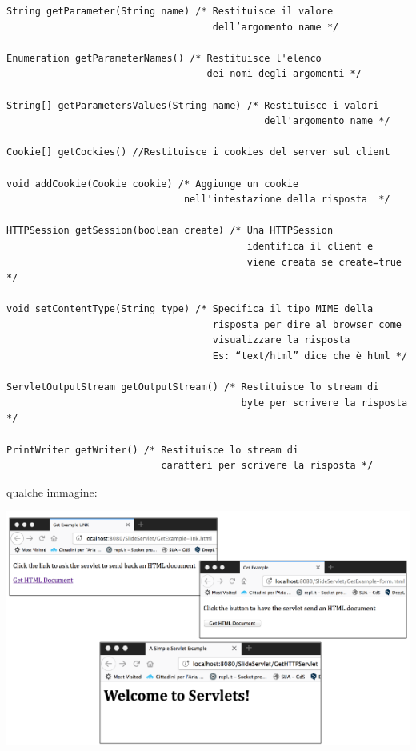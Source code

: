 \documentclass[a4paper,12pt, oneside]{book}
\begin{document}
\begin{verbatim}
String getParameter(String name) /* Restituisce il valore
                                    dell’argomento name */

Enumeration getParameterNames() /* Restituisce l'elenco 
                                   dei nomi degli argomenti */

String[] getParametersValues(String name) /* Restituisce i valori 
                                             dell'argomento name */

Cookie[] getCockies() //Restituisce i cookies del server sul client 

void addCookie(Cookie cookie) /* Aggiunge un cookie
                               nell'intestazione della risposta  */

HTTPSession getSession(boolean create) /* Una HTTPSession
                                          identifica il client e 
                                          viene creata se create=true */
                                          
void setContentType(String type) /* Specifica il tipo MIME della
                                    risposta per dire al browser come 
                                    visualizzare la risposta 
                                    Es: “text/html” dice che è html */
                                          
ServletOutputStream getOutputStream() /* Restituisce lo stream di 
                                         byte per scrivere la risposta */

PrintWriter getWriter() /* Restituisce lo stream di 
                           caratteri per scrivere la risposta */ 
\end{verbatim}
qualche immagine:
\begin{center}
	\includegraphics[scale=2.4]{img/servlet.png}
\end{center}
\end{document}
